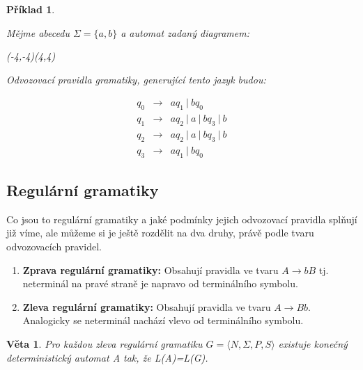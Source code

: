 \documentclass[10pt, a4paper, titlepage]{article}
\theoremstyle{note}
\newtheorem{veta}{\textbf{Věta}}
\newtheorem{priklad}{\textbf{Příklad}}
\begin{document}
\begin{priklad}\label{priklad-4}

Mějme abecedu $\Sigma = \lbrace a,b \rbrace$ a automat zadaný diagramem:
\begin{center}
\begin{VCPicture}{(-4,-4)(4,4)}
\end{VCPicture}
\end{center}

Odvozovací pravidla gramatiky, generující tento jazyk budou:

\begin{eqnarray*}
q_0 &\rightarrow& aq_1\ |\ bq_0 \\
q_1 &\rightarrow& aq_2\ |\ a\ |\ bq_3\ |\  b \\
q_2 &\rightarrow& aq_2\ |\ a\ |\ bq_3\ |\  b \\
q_3 &\rightarrow& aq_1\ |\ bq_0
\end{eqnarray*}

\end{priklad}

\subsection{Regulární gramatiky}

Co jsou to regulární gramatiky a jaké podmínky jejich odvozovací pravidla splňují již víme, ale můžeme si je ještě rozdělit na dva druhy, právě podle tvaru odvozovacích pravidel.

\begin{enumerate}

\item
\textbf{Zprava regulární gramatiky:}
Obsahují pravidla ve tvaru $ A \rightarrow bB $ tj. neterminál na pravé straně je napravo od terminálního symbolu.
\item
\textbf{Zleva regulární gramatiky:}
Obsahují pravidla ve tvaru $ A \rightarrow Bb $. Analogicky se neterminál nachází vlevo od terminálního symbolu.
\end{enumerate}

\begin{veta}
Pro každou zleva regulární gramatiku $ G = \langle N,\Sigma,P,S \rangle $ existuje konečný deterministický automat \textit{A} tak, že \textit{L(A)=L(G)}.
\end{veta}
\end{document}
